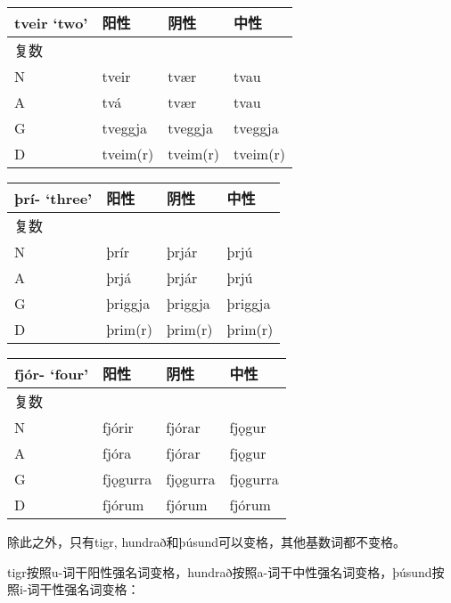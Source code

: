 {{\begin{longtable}{llll}
  \toprule
  tveir `two‌' & 阳性       & 阴性       & 中性       \\
  \midrule
  \endhead
  \bottomrule
  \endfoot
  复数          &          &          &          \\
  N           & tveir    & tvær     & tvau     \\
  A           & tvá      & tvær     & tvau     \\
  G           & tveggja  & tveggja  & tveggja  \\
  D           & tveim(r) & tveim(r) & tveim(r) \\
\end{longtable}

\begin{longtable}{llll}
  \toprule
  þrí- `three‌' & 阳性      & 阴性      & 中性      \\
  \midrule
  \endhead
  \bottomrule
  \endfoot
  复数           &         &         &         \\
  N            & þrír    & þrjár   & þrjú    \\
  A            & þrjá    & þrjár   & þrjú    \\
  G            & þriggja & þriggja & þriggja \\
  D            & þrim(r) & þrim(r) & þrim(r) \\
\end{longtable}

\begin{longtable}{llll}
  \toprule
  fjór- `four‌' & 阳性       & 阴性       & 中性       \\
  \midrule
  \endhead
  \bottomrule
  \endfoot
  复数           &          &          &          \\
  N            & fjórir   & fjórar   & fjǫgur   \\
  A            & fjóra    & fjórar   & fjǫgur   \\
  G            & fjǫgurra & fjǫgurra & fjǫgurra \\
  D            & fjórum   & fjórum   & fjórum   \\
\end{longtable}

除此之外，只有tigr, hundrað和þúsund可以变格，其他基数词都不变格。

tigr按照u-词干阳性强名词变格，hundrað按照a-词干中性强名词变格，þúsund按照i-词干性强名词变格：

}}
